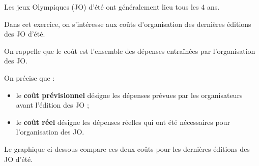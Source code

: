 \documentclass[exercice,a4]{thedocument}%
\begin{document}
%
    


\medskip

Les jeux Olympiques (JO) d'été ont généralement lieu tous les 4 ans.

Dans cet exercice, on s'intéresse aux coûts d'organisation des dernières éditions des JO d'été.

On rappelle que le coût est l'ensemble des dépenses entraînées par l'organisation des JO.

On précise que :

\begin{itemize}
\item le \textbf{coût prévisionnel} désigne les dépenses prévues par les organisateurs avant l'édition des JO ;
\item le \textbf{coût réel} désigne les dépenses réelles qui ont été nécessaires pour l'organisation des JO.
\end{itemize}

Le graphique ci-dessous compare ces deux coûts pour les dernières éditions des JO d'été.

\medskip
\end{document}
